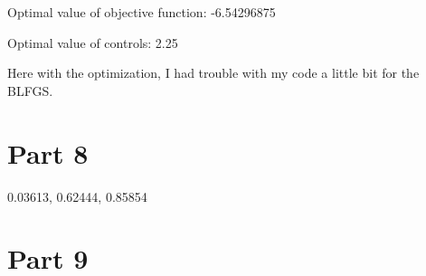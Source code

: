 \documentclass{article}
\begin{document}
Optimal value of objective function:  -6.54296875 

Optimal value of controls: 2.25

Here with the optimization, I had trouble with my code a little bit for the BLFGS.

\section{Part 8}

0.03613, 0.62444, 0.85854


\section{Part 9}
\end{document}
